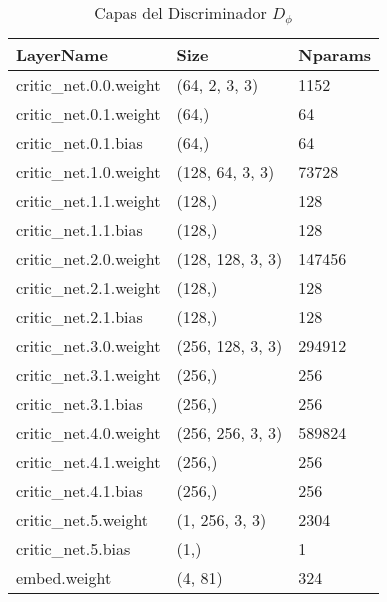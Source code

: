 \begin{table*}
    \caption{Capas del Discriminador $D_\phi$}
    \label{tab:DiscArq}
    \centering
    \begin{tabular}{l l l}
        \hline
        \textbf{LayerName} & \textbf{Size} & \textbf{Nparams} \\
        \hline
        critic\_net.0.0.weight& 	 (64, 2, 3, 3)& 	 1152\\
        critic\_net.0.1.weight& 	 (64,)& 	 64\\
        critic\_net.0.1.bias& 	 (64,)& 	 64\\
        critic\_net.1.0.weight& 	 (128, 64, 3, 3)& 	 73728\\
        critic\_net.1.1.weight& 	 (128,)& 	 128\\
        critic\_net.1.1.bias& 	 (128,)& 	 128\\
        critic\_net.2.0.weight& 	 (128, 128, 3, 3)& 	 147456\\
        critic\_net.2.1.weight& 	 (128,)& 	 128\\
        critic\_net.2.1.bias& 	 (128,)& 	 128\\
        critic\_net.3.0.weight& 	 (256, 128, 3, 3)& 	 294912\\
        critic\_net.3.1.weight& 	 (256,)& 	 256\\
        critic\_net.3.1.bias& 	 (256,)& 	 256\\
        critic\_net.4.0.weight& 	 (256, 256, 3, 3)& 	 589824\\
        critic\_net.4.1.weight& 	 (256,)& 	 256\\
        critic\_net.4.1.bias& 	 (256,)& 	 256\\
        critic\_net.5.weight& 	 (1, 256, 3, 3)& 	 2304\\
        critic\_net.5.bias& 	 (1,)& 	 1\\
        embed.weight& 	 (4, 81)& 	 324\\
        \hline
    \end{tabular}
\end{table*}